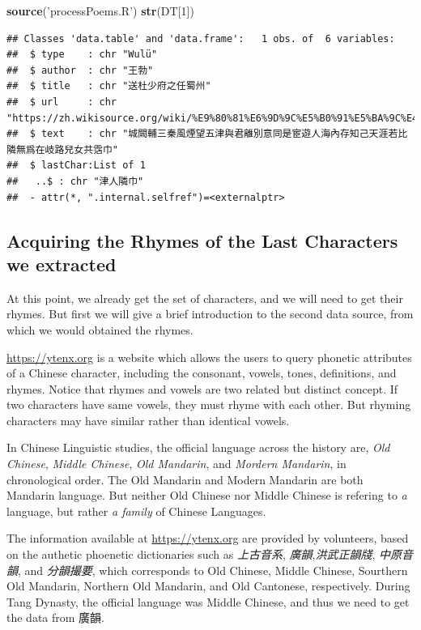 \documentclass[]{article}
\newenvironment{Shaded}{\begin{snugshade}}{\end{snugshade}}
\newcommand{\DecValTok}[1]{\textcolor[rgb]{0.00,0.00,0.81}{#1}}
\newcommand{\KeywordTok}[1]{\textcolor[rgb]{0.13,0.29,0.53}{\textbf{#1}}}
\newcommand{\NormalTok}[1]{#1}
\newcommand{\StringTok}[1]{\textcolor[rgb]{0.31,0.60,0.02}{#1}}
\begin{document}
\begin{Shaded}
\begin{Highlighting}[]
\KeywordTok{source}\NormalTok{(}\StringTok{'processPoems.R'}\NormalTok{)}
\KeywordTok{str}\NormalTok{(DT[}\DecValTok{1}\NormalTok{])}
\end{Highlighting}
\end{Shaded}

\begin{verbatim}
## Classes 'data.table' and 'data.frame':   1 obs. of  6 variables:
##  $ type    : chr "Wulü"
##  $ author  : chr "王勃"
##  $ title   : chr "送杜少府之任蜀州"
##  $ url     : chr "https://zh.wikisource.org/wiki/%E9%80%81%E6%9D%9C%E5%B0%91%E5%BA%9C%E4%B9%8B%E4%BB%BB%E8%9C%80%E5%B7%9E"
##  $ text    : chr "城闕輔三秦風煙望五津與君離別意同是宦遊人海內存知己天涯若比隣無爲在岐路兒女共霑巾"
##  $ lastChar:List of 1
##   ..$ : chr "津人隣巾"
##  - attr(*, ".internal.selfref")=<externalptr>
\end{verbatim}

\hypertarget{acquiring-the-rhymes-of-the-last-characters-we-extracted}{%
\subsection{Acquiring the Rhymes of the Last Characters we
extracted}\label{acquiring-the-rhymes-of-the-last-characters-we-extracted}}

At this point, we already get the set of characters, and we will need to
get their rhymes. But first we will give a brief introduction to the
second data source, from which we would obtained the rhymes.

\url{https://ytenx.org} is a website which allows the users to query
phonetic attributes of a Chinese character, including the consonant,
vowels, tones, definitions, and rhymes. Notice that rhymes and vowels
are two related but distinct concept. If two characters have same
vowels, they must rhyme with each other. But rhyming characters may have
similar rather than identical vowels.

In Chinese Linguistic studies, the official language across the history
are, \emph{Old Chinese}, \emph{Middle Chinese}, \emph{Old Mandarin}, and
\emph{Mordern Mandarin}, in chronological order. The Old Mandarin and
Modern Mandarin are both Mandarin language. But neither Old Chinese nor
Middle Chinese is refering to \emph{a} language, but rather \emph{a
family} of Chinese Languages.

The information available at \url{https://ytenx.org} are provided by
volunteers, based on the authetic phoenetic dictionaries such as
\emph{上古音系}, \emph{廣韻},\emph{洪武正韻牋}, \emph{中原音韻}, and
\emph{分韻撮要}, which corresponds to Old Chinese, Middle Chinese,
Sourthern Old Mandarin, Northern Old Mandarin, and Old Cantonese,
respectively. During Tang Dynasty, the official language was Middle
Chinese, and thus we need to get the data from 廣韻.
\end{document}
